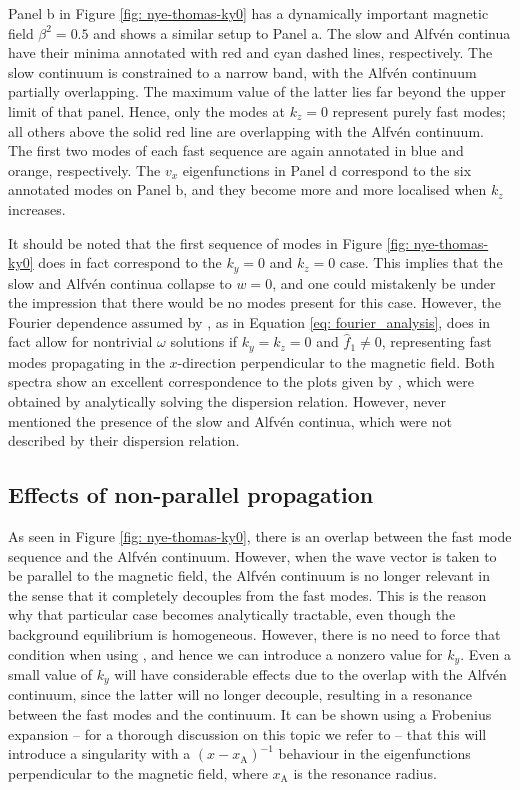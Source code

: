 Panel b in Figure \ref{fig: nye-thomas-ky0} has a dynamically important magnetic field $\beta^2 = 0.5$ and shows a similar setup to Panel a. The slow and Alfv\'en continua have their minima annotated with red and cyan dashed lines, respectively. The slow continuum is constrained to a narrow band, with the Alfv\'en continuum partially overlapping. The maximum value of the latter lies far beyond the upper limit of that panel. Hence, only the modes at $k_z = 0$ represent purely fast modes; all others above the solid red line are overlapping with the Alfv\'en continuum. The first two modes of each fast sequence are again annotated in blue and orange, respectively. The $v_x$ eigenfunctions in Panel d correspond to the six annotated modes on Panel b, and they become more and more localised when $k_z$ increases.

It should be noted that the first sequence of modes in Figure \ref{fig: nye-thomas-ky0} does in fact correspond to the $k_y = 0$ and $k_z = 0$ case. This implies that the slow and Alfv\'en continua collapse to $w = 0$, and one could mistakenly be under the impression that there would be no modes present for this case. However, the Fourier dependence assumed by {\legolas}, as in Equation \eqref{eq: fourier_analysis}, does in fact allow for nontrivial $\omega$ solutions if $k_y = k_z = 0$ and $\hat{f}_1 \neq 0$, representing fast modes propagating in the $x$-direction perpendicular to the magnetic field.
Both spectra show an excellent correspondence to the plots given by \citet{nye1976}, which were obtained by analytically solving the dispersion relation. However, \citet{nye1976} never mentioned the presence of the slow and Alfv\'en continua, which were not described by their dispersion relation.


\subsection{Effects of non-parallel propagation} \label{ss: non_parallel_propagation}
As seen in Figure \ref{fig: nye-thomas-ky0}, there is an overlap between the fast mode sequence and the Alfv\'en continuum. However, when the wave vector is taken to be parallel to the magnetic field, the Alfv\'en continuum is no longer relevant in the sense that it completely decouples from the fast modes. This is the reason why that particular case becomes analytically tractable, even though the background equilibrium is homogeneous. However, there is no need to force that condition when using {\legolas}, and hence we can introduce a nonzero value for $k_y$. Even a small value of $k_y$ will have considerable effects due to the overlap with the Alfv\'en continuum, since the latter will no longer decouple, resulting in a resonance between the fast modes and the continuum.
It can be shown using a Frobenius expansion -- for a thorough discussion on this topic we refer to \citet{book_MHD} -- that this will introduce a singularity with a $\left(x - x_\text{A}\right)^{-1}$ behaviour in the eigenfunctions perpendicular to the magnetic field, where $x_\text{A}$ is the resonance radius.


